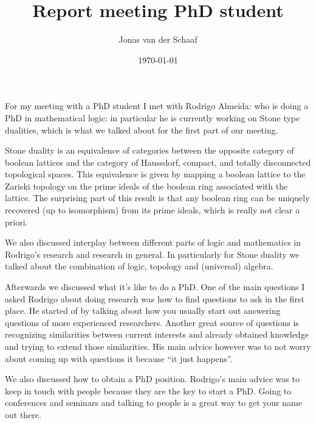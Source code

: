 \documentclass{article}
\title{Report meeting PhD student}
\author{Jonas van der Schaaf}
\date{\today}
\begin{document}
\maketitle

For my meeting with a PhD student I met with Rodrigo Almeida: who is doing a PhD
in mathematical logic: in particular he is currently working on Stone type
dualities, which is what we talked about for the first part of our meeting.

Stone duality is an equivalence of categories between the opposite category of
boolean lattices and the category of Haussdorf, compact, and totally
disconnected topological spaces. This equivalence is given by mapping a boolean
lattice to the Zariski topology on the prime ideals of the boolean ring
associated with the lattice. The surprising part of this result is that any
boolean ring can be uniquely recovered (up to isomorphism) from its prime
ideals, which is really not clear a priori.

We also discussed interplay between different parts of logic and mathematics in
Rodrigo's research and research in general. In particularly for Stone duality we
talked about the combination of logic, topology and (universal) algebra.

Afterwards we discussed what it's like to do a PhD. One of the main questions I
asked Rodrigo about doing research was how to find questions to ask in the first
place. He started of by talking about how you usually start out answering
questions of more experienced researchers. Another great source of questions is
recognizing similarities between current interests and already obtained
knowledge and trying to extend those similarities. His main advice however was
to not worry about coming up with questions it because ``it just happens''.

We also discussed how to obtain a PhD position. Rodrigo's main advice was to
keep in touch with people because they are the key to start a PhD. Going to
conferences and seminars and talking to people is a great way to get your name
out there.
\end{document}
